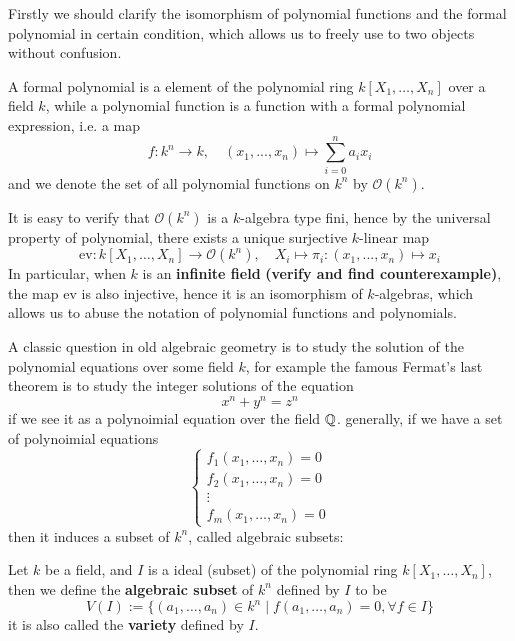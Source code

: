 \documentclass[12pt,a4paper]{article}
\begin{document}
Firstly we should clarify the isomorphism of polynomial functions and the formal polynomial in certain condition, which allows us to freely use to two objects without confusion.
\begin{definitionplain}
    A formal polynomial is a element of the polynomial ring \(k[X_1,\dots,X_n]\) over a field \(k\), while a polynomial function is a function with a formal polynomial expression, i.e. a map
    \[f: k^n \to k, \quad (x_1,...,x_n) \mapsto \sum_{i=0}^{n}a_i x_i\]
    and we denote the set of all polynomial functions on \(k^n\) by \(\mathcal{O}(k^n)\).\\
\end{definitionplain}

It is easy to verify that \(\mathcal{O}(k^n)\) is a \(k\)-algebra type fini, hence by the universal property of polynomial, there exists a unique surjective \(k\)-linear map
\[\mathrm{ev}:k[X_1,\dots,X_n] \to \mathcal{O}(k^n), \quad X_i \mapsto \pi_i: (x_1,...,x_n) \mapsto x_i\]
In particular, when \(k\) is an \textbf{infinite field}\textbf{ (verify and find counterexample)}, the map \(\mathrm{ev}\) is also injective, hence it is an isomorphism of \(k\)-algebras, which allows us to abuse the notation of polynomial functions and polynomials.

A classic question in old algebraic geometry is to study the solution of the polynomial equations over some field \(k\), for example the famous Fermat's last theorem is to study the integer solutions of the equation
\[x^n + y^n = z^n\]
if we see it as a polynoimial equation over the field \(\mathbb{Q}\). generally, if we have a set of polynoimial equations
\begin{equation}\label{eq:poly-equations}
    \begin{cases}
    f_1(x_1,\dots,x_n) = 0\\
    f_2(x_1,\dots,x_n) = 0\\
    \vdots \\
    f_m(x_1,\dots,x_n) = 0
    \end{cases}
\end{equation}
then it induces a subset of \(k^n\), called algebraic subsets:
\begin{definitionplain}
    Let \(k\) be a field, and \(I\) is a ideal (subset) of the polynomial ring \(k[X_1,\dots,X_n]\), then we define the \textbf{algebraic subset} of \(k^n\) defined by \(I\) to be
    \[V(I) := \{(a_1,\dots,a_n) \in k^n \mid f(a_1,\dots,a_n) = 0, \forall f \in I\}\]
    it is also called the \textbf{variety} defined by \(I\).\\
\end{definitionplain}
\end{document}
